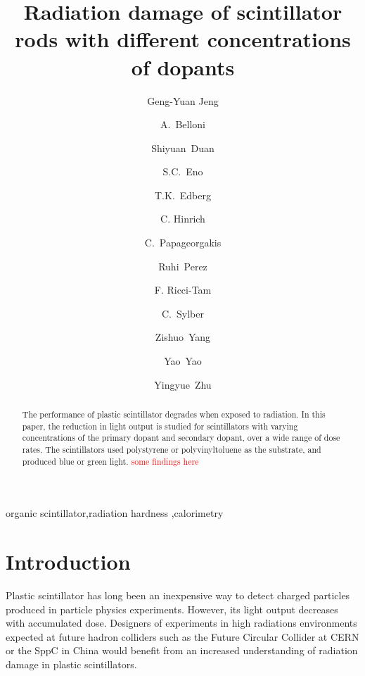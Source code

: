 \documentclass[review]{elsarticle}
\begin{document}
\begin{frontmatter}

\title{Radiation damage of scintillator rods with different concentrations of dopants
}


\author[umd]{Geng-Yuan Jeng}
\author[umd]{A.~Belloni}
\author[umd]{Shiyuan~Duan}
\author[umd]{S.C.~Eno}
\author[umd]{T.K.~Edberg}
\author[umd]{C. Hinrich}
\author[umd]{C.~Papageorgakis}
\author[umd]{Ruhi~Perez}
\author[umd]{F. Ricci-Tam}
\author[umd]{C.~Sylber}
\author[umd]{Zishuo~Yang}
\author[umd]{Yao~Yao}
\author[umd]{Yingyue~Zhu}

\address[umd]{Dept. Physics, U. Maryland, College Park MD 30742 USA}



\begin{abstract}
The performance of plastic scintillator degrades when exposed to radiation. 
In this paper, the reduction in light output 
is studied for scintillators
with varying concentrations of the primary dopant and secondary dopant,
over a wide range of dose rates.
The scintillators used polystyrene or polyvinyltoluene as the substrate, and
produced blue or green light. \textcolor{red}{some findings here}
\end{abstract}

\begin{keyword}
organic scintillator\sep radiation hardness \sep calorimetry
\end{keyword}

\end{frontmatter}

\linenumbers

\section{Introduction}
Plastic scintillator has long been an inexpensive way to detect 
charged particles produced in particle physics experiments.  
However, its 
light output decreases with accumulated dose.  
Designers of experiments in high radiations environments expected
at future hadron colliders such as the Future Circular Collider at CERN\cite{fcc}
or the SppC in China\cite{sppc}
would benefit from an increased understanding
of radiation damage in plastic scintillators.
\end{document}
